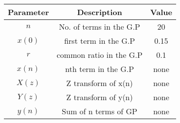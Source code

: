 \renewcommand{\arraystretch}{1.5}
\begin{tabular}{|c|c|c|}
\hline
Parameter & Description & Value \\\hline
\( n \) & No. of terms in the G.P &20 \\\hline
\(x(0) \) & first term in the G.P&0.15 \\\hline
\( r \) & common ratio in the G.P& 0.1 \\\hline
\( x(n) \) & nth term in the G.P& none \\\hline
\( X(z) \) & Z transform of x(n)& none \\\hline
\( Y(z) \) & Z transform of y(n)& none \\\hline
\(y(n)\)& Sum of n terms of GP& none\\\hline
\end{tabular}
